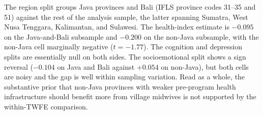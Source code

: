 The region split groups Java provinces and Bali (IFLS province codes 31--35 and 51) against the rest of the analysis sample, the latter spanning Sumatra, West Nusa Tenggara, Kalimantan, and Sulawesi. The health-index estimate is $-0.095$ on the Java-and-Bali subsample and $-0.200$ on the non-Java subsample, with the non-Java cell marginally negative ($t=-1.77$). The cognition and depression splits are essentially null on both sides. The socioemotional split shows a sign reversal ($-0.104$ on Java and Bali against $+0.054$ on non-Java), but both cells are noisy and the gap is well within sampling variation. Read as a whole, the substantive prior that non-Java provinces with weaker pre-program health infrastructure should benefit more from village midwives is not supported by the within-TWFE comparison.

